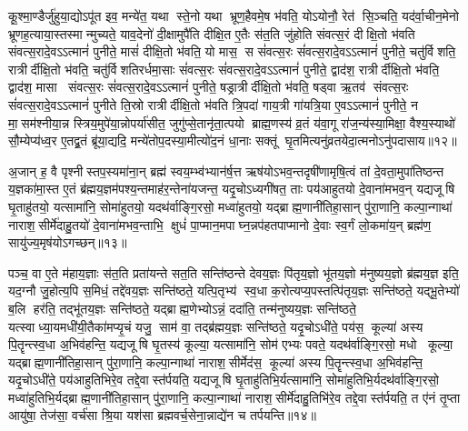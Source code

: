 कू॒श्मा॒ण्डैर्जु॑हुया॒द्योऽपू॑त इव॒ मन्ये॑त॒ यथा स्ते॒नो यथा भ्रूण॒हैवमे॒ष भ॑वति॒ योऽयोनौ॒ रेत॑ सि॒ञ्चति॒ यद॑र्वा॒चीन॒मेनो भ्रूणह॒त्याया॒स्तस्मान्मुच्यते॒ याव॒देनो॑ दी॒क्षामुपै॑ति दीक्षि॒त ए॒तैः स॑त॒ति जु॑होति संवत्स॒रं दीक्षि॒तो भ॑वति संवत्स॒रादे॒वऽऽत्मानं॑ पुनीते॒ मासं॑ दीक्षि॒तो भ॑वति॒ यो मास॒ स सं॑वत्स॒रः सं॑वत्स॒रादे॒वऽऽत्मानं॑ पुनीते॒ चतु॑र्विशति॒ रात्रीर्दीक्षि॒तो भ॑वति॒ चतु॑र्विशतिरर्धमा॒साः सं॑वत्स॒रः सं॑वत्स॒रादे॒वऽऽत्मानं॑ पुनीते॒ द्वाद॑श॒ रात्रीर्दीक्षि॒तो भ॑वति॒ द्वाद॑श॒ मासा संवत्स॒रः सं॑वत्स॒रादे॒वऽऽत्मानं॑ पुनीते॒ षड्रात्रीर्दीक्षि॒तो भ॑वति॒ षड्वा ऋ॒तव॑ संवत्स॒रः सं॑वत्स॒रादे॒वऽऽत्मानं॑ पुनीते ति॒स्रो रात्रीर्दीक्षि॒तो भ॑वति त्रि॒पदा॑ गाय॒त्री गा॑यत्रि॒या ए॒वऽऽत्मानं॑ पुनीते॒ न मा॒सम॑श्नीया॒न्न स्त्रिय॒मुपे॑या॒न्नोपर्या॑सीत॒ जुगु॑प्से॒तानृ॑ता॒त्पयो ब्राह्म॒णस्य॑ व्र॒तं य॑वा॒गू रा॑ज॒न्य॑स्या॒मिक्षा॒ वैश्य॒स्याथो॑ सौ॒म्येप्य॑ध्व॒र ए॒तद्व्र॒तं ब्रू॑या॒द्यदि॒ मन्ये॑तोप॒दस्या॒मीत्यो॑द॒नं धा॒नाः सक्तूं घृ॒तमित्यनु॑व्रतयेदा॒त्मनोऽनु॑पदासाय॥१२॥ 
\anuvakamend

अ॒जान् ह॒ वै पृश्नीस्तप॒स्यमा॑ना॒न् ब्रह्म॑ स्वय॒म्भ्व॑भ्यान॑र्\mbox{}ष॒त्त ऋष॑योऽभव॒न्तदृषी॑णामृषि॒त्वं तां दे॒वता॒मुपा॑तिष्ठन्त य॒ज्ञका॑मा॒स्त ए॒तं ब्र॑ह्मय॒ज्ञम॑पश्य॒न्तमाह॑र॒न्तेना॑यजन्त॒ यदृ॒चोऽध्यगी॑षत॒ ताः पय॑आहुतयो दे॒वाना॑मभव॒न् यद्यजूषि घृ॒ताहु॑तयो॒ यत्सामा॑नि॒ सोमा॑हुतयो॒ यदथ॑र्वाङ्गि॒रसो॒ मध्वा॑हुतयो॒ यद्ब्राह्म॒णानी॑तिहा॒सान् पु॑रा॒णानि॒ कल्पा॒न्गाथा॑ नाराश॒सीर्मे॑दाहु॒तयो॑ दे॒वाना॑मभव॒न्ताभि॒ क्षुधं॑ पा॒प्मान॒मपाघ्न॒न्नप॑हतपाप्मानो दे॒वाः स्व॒र्गं लो॒कमा॑य॒न् ब्रह्म॑ण॒ सायु॑ज्य॒मृष॑योऽगच्छन्॥१३॥\anuvakamend

पञ्च॒ वा ए॒ते म॑हाय॒ज्ञाः स॑त॒ति प्रता॑यन्ते सत॒ति सन्ति॑ष्ठन्ते देवय॒ज्ञः पि॑तृय॒ज्ञो भू॑तय॒ज्ञो म॑नुष्यय॒ज्ञो ब्र॑ह्मय॒ज्ञ इति॒ यद॒ग्नौ जु॒होत्य॒पि स॒मिधं॒ तद्दे॑वय॒ज्ञः सन्ति॑ष्ठते॒ यत्पि॒तृभ्य॑ स्व॒धा क॒रोत्यप्य॒पस्तत्पि॑तृय॒ज्ञः सन्ति॑ष्ठते॒ यद्भू॒तेभ्यो॑ ब॒लि हर॑ति॒ तद्भू॑तय॒ज्ञः सन्ति॑ष्ठते॒ यद्ब्राह्म॒णेभ्योऽन्नं॒ ददा॑ति॒ तन्म॑नुष्यय॒ज्ञः सन्ति॑ष्ठते॒ यत्स्वाध्या॒यमधी॑यी॒तैका॑मप्यृ॒चं यजु॒ साम॑ वा॒ तद्ब्र॑ह्मय॒ज्ञः सन्ति॑ष्ठते॒ यदृ॒चोऽधी॑ते॒ पय॑स॒ कूल्या॑ अस्य पि॒तॄन्त्स्व॒धा अ॒भिव॑हन्ति॒ यद्यजूषि घृ॒तस्य॑ कूल्या॒ यत्सामा॑नि॒ सोम॑ एभ्यः पवते॒ यदथ॑र्वाङ्गि॒रसो॒ मधो कूल्या॒ यद्ब्राह्म॒णानी॑तिहा॒सान् पु॑रा॒णानि॒ कल्पा॒न्गाथा॑ नाराश॒सीर्मेद॑स॒ कूल्या॑ अस्य पि॒तॄन्त्स्व॒धा अ॒भिव॑हन्ति॒ यदृ॒चोऽधी॑ते॒ पय॑आहुतिभिरे॒व तद्दे॒वास्त॑र्पयति॒ यद्यजूषि घृ॒ताहु॑तिभि॒र्यत्सामा॑नि॒ सोमा॑हुतिभि॒र्यदथ॑र्वाङ्गि॒रसो॒ मध्वा॑\-हुतिभि॒र्यद्ब्राह्म॒णानी॑तिहा॒सान् पु॑रा॒णानि॒ कल्पा॒न्गाथा॑ नाराश॒सीर्मे॑दाहु॒तिभि॑रे॒व तद्दे॒वास्त॑र्पयति॒ त ए॑नं तृ॒प्ता आयु॑षा॒ तेज॑सा॒ वर्च॑सा श्रि॒या यश॑सा ब्रह्मवर्च॒सेना॒न्नाद्ये॑न च तर्पयन्ति॥१४॥
\anuvakamend


